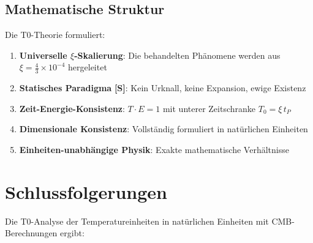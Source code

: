 	\subsection{Mathematische Struktur}
	
	Die T0-Theorie formuliert:
	\begin{enumerate}
		\item \textbf{Universelle $\xi$-Skalierung}: Die behandelten Phänomene werden aus $\xi = \frac{4}{3} \times 10^{-4}$ hergeleitet
		\item \textbf{Statisches Paradigma} \textbf{[S]}: Kein Urknall, keine Expansion, ewige Existenz
		\item \textbf{Zeit-Energie-Konsistenz}: $T\cdot E = 1$ mit unterer Zeitschranke $T_0 = \xi\,t_P$
		\item \textbf{Dimensionale Konsistenz}: Vollständig formuliert in natürlichen Einheiten
		\item \textbf{Einheiten-unabhängige Physik}: Exakte mathematische Verhältnisse
	\end{enumerate}
	
	\section{Schlussfolgerungen}
	
	Die T0-Analyse der Temperatureinheiten in natürlichen Einheiten mit CMB-Berechnungen ergibt:
	
